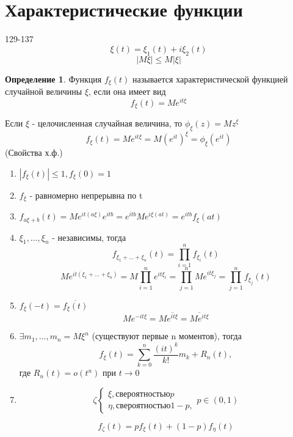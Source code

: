 \documentclass[a4paper]{article}
\theoremstyle{definition}
\newtheorem*{definition}{Определение}
\theoremstyle{remark}
\begin{document}
\section{Характеристические функции}
129-137 
\[\xi(t) = \xi_1(t)+ i\xi_2(t)\]
\[|M\xi| \le M |\xi|\]
\begin{definition}
    Функция $f_\xi(t)$ называется характеристической функцией случайной величины $\xi$, если она имеет вид
    \[f_\xi(t)  = Me^{it\xi}\]
\end{definition}
Если $\xi$ - целочисленная случайная величина, то $\phi_\xi (z) = M z^\xi$
\[f_\xi (t) = M e^{it\xi} = M (e^{it})^\xi = \phi_\xi (e^{it})\]
(Свойства х.ф.)
\begin{enumerate}
    \item $|f_\xi(t)|\le 1, f_\xi(0) = 1$
    \item $f_\xi$ - равномерно непрерывна по t
    \item $f_{a\xi+ b}(t) = M e^{it(a\xi)}e^{itb} = e^{itb} M e^{i\xi(at)} = e^{itb} f_\xi(at)$
    \item $\xi_1, \dots, \xi_n$ - независимы, тогда
    \[f_{\xi_1+ \dots+ \xi_n}(t) = \prod_{i = 1}^n f_{\xi_i}(t)\]
    \[M e^{it (\xi_1+ \dots+ \xi_n)} = M \prod_{i = 1}^{n} e^{it \xi_i} = \prod_{j = 1}^{n} M e^{it \xi_j} = \prod_{j = 1}^n f_{\xi_j} (t)\]
    \item $f_\xi(-t) = \overline{f_\xi(t) }$
    \[M e^{-it\xi} = M \overline{ e^{it\xi}} = \overline{M e^{it\xi}}\]
    \item $\exists m_1, \dots, m_n = M \xi^n$ (существуют первые n моментов), тогда 
    \[f_\xi(t) = \sum_{k = 0}^{n}\frac{(it)^k}{k!}m_k + R_n(t),\]
    где $R_n(t) = o(t^n)$ при $t \to 0$
    \item \[\zeta  \begin{cases}
        \xi, с вероятностью p \\
        \eta, с вероятностью 1 - p,
        \end{cases}
        p \in (0, 1)\]
        
        \[f_\zeta (t)  = p f_\xi (t) + (1 - p) f_\eta(t)\]
\end{enumerate}
\end{document}
